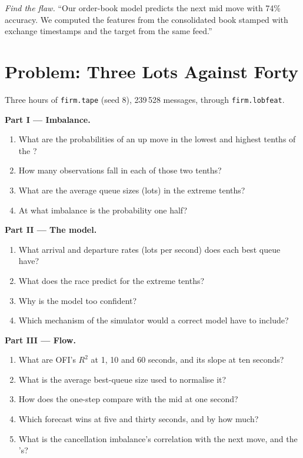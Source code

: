 \begin{exercise}[$\star\star\star$]\label{exo:rs:order-book-features:8}
\emph{Find the flaw.} ``Our order-book model predicts the next mid move with 74\% accuracy. We computed the features from the consolidated
book stamped with exchange timestamps and the target from the same feed.''
\end{exercise}

\section{Problem: Three Lots Against Forty}

\begin{problem}\label{pb:rs:order-book-features:1}
Three hours of \texttt{firm.tape} (seed 8), 239\,528 messages, through \texttt{firm.lobfeat}.

\medskip\noindent\textbf{Part I --- Imbalance.}
\begin{enumerate}
\item What are the probabilities of an up move in the lowest and highest tenths of the ?
\item How many observations fall in each of those two tenths?
\item What are the average queue sizes (lots) in the extreme tenths?
\item At what imbalance is the probability one half?
\end{enumerate}

\medskip\noindent\textbf{Part II --- The model.}
\begin{enumerate}[resume]
\item What arrival and departure rates (lots per second) does each best queue have?
\item What does the race predict for the extreme tenths?
\item Why is the model too confident?
\item Which mechanism of the simulator would a correct model have to include?
\end{enumerate}

\medskip\noindent\textbf{Part III --- Flow.}
\begin{enumerate}[resume]
\item What are OFI's $R^2$ at 1, 10 and 60 seconds, and its slope at ten seconds?
\item What is the average best-queue size used to normalise it?
\item How does the one-step  compare with the mid at one second?
\item Which forecast wins at five and thirty seconds, and by how much?
\item What is the cancellation imbalance's correlation with the next move, and the 's?
\end{enumerate}


\end{problem}
